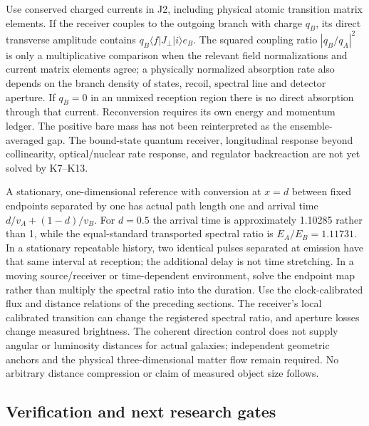 \documentclass[
  11pt,
  twoside]{article}
\begin{document}
Use conserved charged currents in J2, including physical atomic
transition matrix elements. If the receiver couples to the outgoing
branch with charge \(q_B\), its direct transverse amplitude contains
\(q_B\langle f|J_\perp|i\rangle e_B\). The squared coupling ratio
\(|q_B/q_A|^2\) is only a multiplicative comparison when the relevant
field normalizations and current matrix elements agree; a physically
normalized absorption rate also depends on the branch density of states,
recoil, spectral line and detector aperture. If \(q_B=0\) in an unmixed
reception region there is no direct absorption through that current.
Reconversion requires its own energy and momentum ledger. The positive
bare mass has not been reinterpreted as the ensemble-averaged gap. The
bound-state quantum receiver, longitudinal response beyond collinearity,
optical/nuclear rate response, and regulator backreaction are not yet
solved by K7--K13.

A stationary, one-dimensional reference with conversion at \(x=d\)
between fixed endpoints separated by one has actual path length one and
arrival time \(d/v_A+(1-d)/v_B\). For \(d=0.5\) the arrival time is
approximately 1.10285 rather than 1, while the equal-standard
transported spectral ratio is \(E_A/E_B=1.11731\). In a stationary
repeatable history, two identical pulses separated at emission have that
same interval at reception; the additional delay is not time stretching.
In a moving source/receiver or time-dependent environment, solve the
endpoint map rather than multiply the spectral ratio into the duration.
Use the clock-calibrated flux and distance relations of the preceding
sections. The receiver's local calibrated transition can change the
registered spectral ratio, and aperture losses change measured
brightness. The coherent direction control does not supply angular or
luminosity distances for actual galaxies; independent geometric anchors
and the physical three-dimensional matter flow remain required. No
arbitrary distance compression or claim of measured object size follows.

\subsection{Verification and next research
gates}\label{verification-and-next-research-gates}
\end{document}
